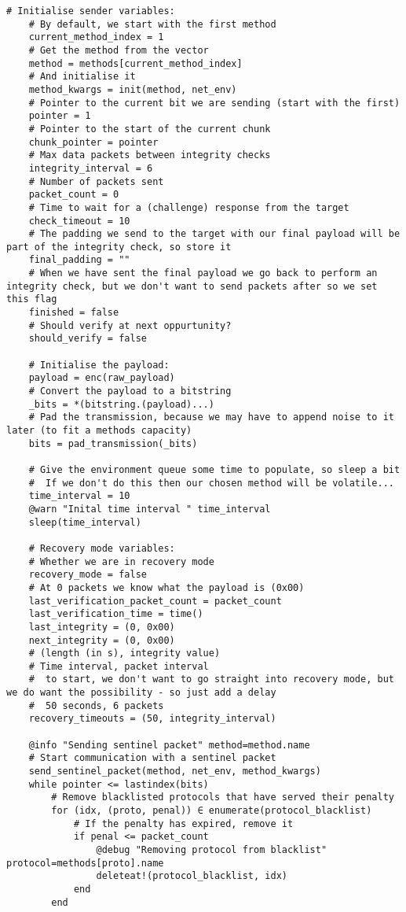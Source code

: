\begin{lstlisting}[language=JuliaLocal, style=julia]
    # Initialise sender variables:
    # By default, we start with the first method
    current_method_index = 1
    # Get the method from the vector
    method = methods[current_method_index]
    # And initialise it
    method_kwargs = init(method, net_env)
    # Pointer to the current bit we are sending (start with the first)
    pointer = 1
    # Pointer to the start of the current chunk
    chunk_pointer = pointer
    # Max data packets between integrity checks
    integrity_interval = 6
    # Number of packets sent
    packet_count = 0
    # Time to wait for a (challenge) response from the target
    check_timeout = 10
    # The padding we send to the target with our final payload will be part of the integrity check, so store it
    final_padding = ""
    # When we have sent the final payload we go back to perform an integrity check, but we don't want to send packets after so we set this flag
    finished = false
    # Should verify at next oppurtunity?
    should_verify = false

    # Initialise the payload:
    payload = enc(raw_payload)
    # Convert the payload to a bitstring
    _bits = *(bitstring.(payload)...)
    # Pad the transmission, because we may have to append noise to it later (to fit a methods capacity)
    bits = pad_transmission(_bits)
    
    # Give the environment queue some time to populate, so sleep a bit
    #  If we don't do this then our chosen method will be volatile...  
    time_interval = 10
    @warn "Inital time interval " time_interval
    sleep(time_interval)
    
    # Recovery mode variables:
    # Whether we are in recovery mode
    recovery_mode = false
    # At 0 packets we know what the payload is (0x00)
    last_verification_packet_count = packet_count
    last_verification_time = time()
    last_integrity = (0, 0x00) 
    next_integrity = (0, 0x00)
    # (length (in s), integrity value)
    # Time interval, packet interval
    #  to start, we don't want to go straight into recovery mode, but we do want the possibility - so just add a delay
    #  50 seconds, 6 packets
    recovery_timeouts = (50, integrity_interval)

    @info "Sending sentinel packet" method=method.name
    # Start communication with a sentinel packet
    send_sentinel_packet(method, net_env, method_kwargs)
    while pointer <= lastindex(bits)
        # Remove blacklisted protocols that have served their penalty
        for (idx, (proto, penal)) ∈ enumerate(protocol_blacklist)
            # If the penalty has expired, remove it
            if penal <= packet_count
                @debug "Removing protocol from blacklist" protocol=methods[proto].name
                deleteat!(protocol_blacklist, idx)
            end
        end


\end{lstlisting}
